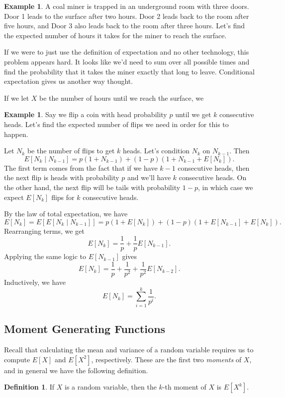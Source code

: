 \documentclass[12pt]{article}
\theoremstyle{plain}
\theoremstyle{definition}
\newtheorem{definition}[theorem]{Definition}
\newtheorem{example}[theorem]{Example}
\theoremstyle{remark}
\begin{document}
\begin{example}
    A coal miner is trapped in an underground room with three doors. Door 1 leads to the surface after two hours.
    Door 2 leads back to the room after five hours, and Door 3 also leads back to the room after three hours.
    Let's find the expected number of hours it takes for the miner to reach the surface.

    If we were to just use the definition of expectation and no other technology, this problem appears hard.
    It looks like we'd need to sum over all possible times and find the probability that it takes the miner exactly that long to leave.
    Conditional expectation gives us another way thought.

    If we let $X$ be the number of hours until we reach the surface, we 
\end{example}

\begin{example}
    Say we flip a coin with head probability $p$ until we get $k$ consecutive heads.
    Let's find the expected number of flips we need in order for this to happen.

    Let $N_k$ be the number of flips to get $k$ heads.
    Let's condition $N_k$ on $N_{k-1}$.
    Then
    \[
        E[N_k \mid N_{k-1}] = p(1+N_{k-1}) + (1-p)(1 + N_{k-1} + E[N_k]).
    \]
    The first term comes from the fact that if we have $k-1$ consecutive heads, then the next flip is heads with probability $p$ and we'll have $k$ consecutive heads.
    On the other hand, the next flip will be tails with probability $1-p$, in which case we expect $E[N_k]$ flips for $k$ consecutive heads.

    By the law of total expectation, we have
    \[
        E[N_k] = E[E[N_k\mid N_{k-1}]] = p(1 + E[N_k]) + (1-p)(1 + E[N_{k-1}] + E[N_k]).
    \]
    Rearranging terms, we get
    \[
        E[N_k] = \frac{1}{p} + \frac{1}{p}E[N_{k-1}].
    \]
    Applying the same logic to $E[N_{k-1}]$ gives
    \[
        E[N_k] = \frac{1}{p} + \frac{1}{p^2} + \frac{1}{p^2}E[N_{k-2}].
    \]
    Inductively, we have
    \[
        E[N_k] = \sum_{i=1}^k\frac{1}{p^i}.
    \]
\end{example}










\subsection{Moment Generating Functions}
Recall that calculating the mean and variance of a random variable requires us to compute $E[X]$ and $E[X^2]$, respectively.
These are the first two \emph{moments} of $X$, and in general we have the following definition.
\begin{definition}
    If $X$ is a random variable, then the $k$-th moment of $X$ is $E[X^k]$.
\end{definition}
\end{document}
